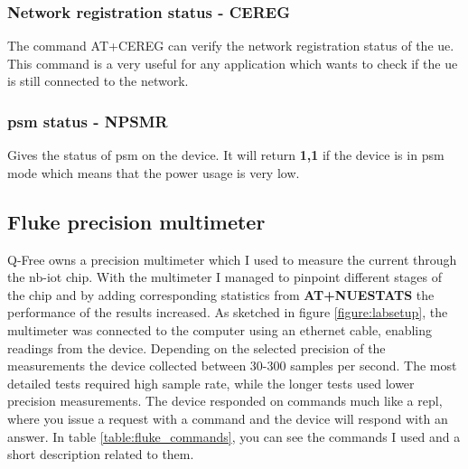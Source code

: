 \documentclass[USenglish]{ifimaster}  %
\begin{document}
\subsubsection{Network registration status - CEREG}
The command AT+CEREG can verify the network registration status of the \acrshort{ue}. This command is a very useful for any application which wants to check if the \acrshort{ue} is still connected to the network.

\subsubsection{\acrshort{psm} status - NPSMR}
Gives the status of \acrshort{psm} on the device. It will return \textbf{1,1} if the device is in \acrshort{psm} mode which means that the power usage is very low.

\subsection{Fluke precision multimeter}
Q-Free owns a precision multimeter which I used to measure the current through the \acrshort{nb-iot} chip. With the multimeter I managed to pinpoint different stages of the chip and by adding corresponding statistics from \textbf{AT+NUESTATS} the performance of the results increased. As sketched in figure \vref{figure:labsetup}, the multimeter was connected to the computer using an ethernet cable, enabling readings from the device.
Depending on the selected precision of the measurements the device collected between 30-300 samples per second. The most detailed tests required high sample rate, while the longer tests used lower precision measurements. The device responded on commands much like a \acrfull{repl}, where you issue a request with a command and the device will respond with an answer. In table \vref{table:fluke_commands}, you can see the commands I used and a short description related to them.

\begin{table}[H]
\centering
{}
\caption{Fluke commands}
\label{table:fluke_commands}
\end{table}
\end{document}
